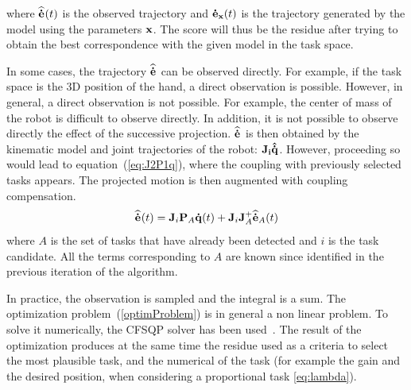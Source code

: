 \documentclass[letterpaper, 10pt, conference]{ieeeconf}      %
\begin{document}
\noindent where ${\mathbf{\widehat{\dot{e}}}}_{}(t)$ is the observed trajectory and ${\mathbf{\dot{e}}}_{{\mathbf{x}}}(t)$ is the trajectory
generated by the model using the parameters ${\mathbf{x}}$.
The score will thus be the residue after trying to obtain the best correspondence with the given
model in the task space.

In some cases, the trajectory ${\mathbf{\widehat{\dot{e}}}}_{}$ can be observed directly. For example, if the task space 
is the 3D position of the hand, a direct observation is possible.
However, in general, a direct observation is not possible. For example,
the center of mass of the robot is difficult to observe directly. 
In addition, it is not possible to observe directly the effect of the successive projection. 
${\mathbf{\widehat{\dot{e}}}}_{}$ is then obtained by the kinematic model and 
joint trajectories of the robot: ${\mathbf{J_i}}{\mathbf{\hat{\dot{q}}}}$.
However, proceeding so would lead to equation~(\ref{eq:J2P1q}), where the coupling with previously
selected tasks appears. The projected motion is then augmented with coupling compensation.
\begin{equation}
  {\mathbf{\widehat{\dot{e}}}}_{}(t) = {\mathbf{J}}_i{\mathbf{P}}_A {\mathbf{\dot{q}}}(t) + {\mathbf{J}}_i{\mathbf{J}}_A^+{\mathbf{\widehat{\dot{e}}}}_{A}(t)
  \label{eq:compensation}
\end{equation}
where $A$ is the set of tasks that have already been detected and $i$ is the task candidate.
All the terms corresponding to $A$ are known since identified in the previous
iteration of the algorithm.


\medskip
In practice, the observation is sampled and the integral is a sum.
The optimization problem~(\ref{optimProblem}) is in general a non linear problem. To solve
it numerically, the CFSQP solver has been used~\cite{lawrence97}. The result of the optimization produces at the same time the residue used as a criteria to select the most plausible task, and the numerical of the task (for example the gain and the desired position, when considering a proportional task \eqref{eq:lambda}).
\end{document}
